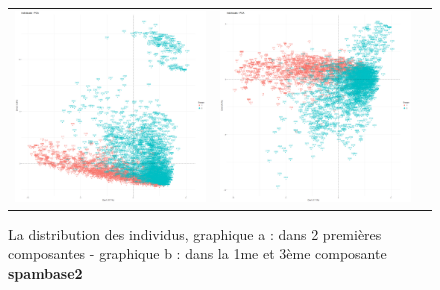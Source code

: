 \documentclass[a4paper,11pt,oneside,roman]{article}
\begin{document}
\begin{figure}[htb]
    \centering
    \begin{tabular}{ccc}
    \includegraphics[scale = .1]{./discrimination/spambase2/indi_plot12.png} &
    \includegraphics[scale = .1]{./discrimination/spambase2/indi_plot13.png} 
    \end{tabular}
    \caption{La distribution des individus, graphique a : dans 2 premières composantes - graphique b : dans la 1me et 3ème composante \textbf{spambase2}}
    \label{fig:my_label}
\end{figure}
\end{document}
